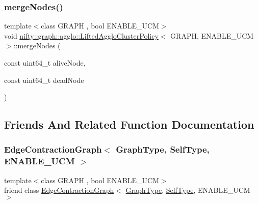 \subsubsection{\texorpdfstring{merge\+Nodes()}{mergeNodes()}}
{\footnotesize\ttfamily template$<$class G\+R\+A\+PH , bool E\+N\+A\+B\+L\+E\+\_\+\+U\+CM$>$ \\
void \hyperlink{classnifty_1_1graph_1_1agglo_1_1LiftedAggloClusterPolicy}{nifty\+::graph\+::agglo\+::\+Lifted\+Agglo\+Cluster\+Policy}$<$ G\+R\+A\+PH, E\+N\+A\+B\+L\+E\+\_\+\+U\+CM $>$\+::merge\+Nodes (\begin{DoxyParamCaption}\item[{const uint64\+\_\+t}]{alive\+Node,  }\item[{const uint64\+\_\+t}]{dead\+Node }\end{DoxyParamCaption})\hspace{0.3cm}{\ttfamily [inline]}}



\subsection{Friends And Related Function Documentation}
\mbox{\label{classnifty_1_1graph_1_1agglo_1_1LiftedAggloClusterPolicy_a6939aa4c6113ba9c44fd5e048687ba92}} 
\subsubsection{\texorpdfstring{Edge\+Contraction\+Graph$<$ Graph\+Type, Self\+Type, E\+N\+A\+B\+L\+E\+\_\+\+U\+C\+M $>$}{EdgeContractionGraph< GraphType, SelfType, ENABLE\_UCM >}}
{\footnotesize\ttfamily template$<$class G\+R\+A\+PH , bool E\+N\+A\+B\+L\+E\+\_\+\+U\+CM$>$ \\
friend class \hyperlink{classnifty_1_1graph_1_1EdgeContractionGraph}{Edge\+Contraction\+Graph}$<$ \hyperlink{classnifty_1_1graph_1_1agglo_1_1LiftedAggloClusterPolicy_a727d681b2fa133b8c9b225ab11cd2402}{Graph\+Type}, \hyperlink{classnifty_1_1graph_1_1agglo_1_1LiftedAggloClusterPolicy}{Self\+Type}, E\+N\+A\+B\+L\+E\+\_\+\+U\+CM $>$\hspace{0.3cm}{\ttfamily [friend]}}



